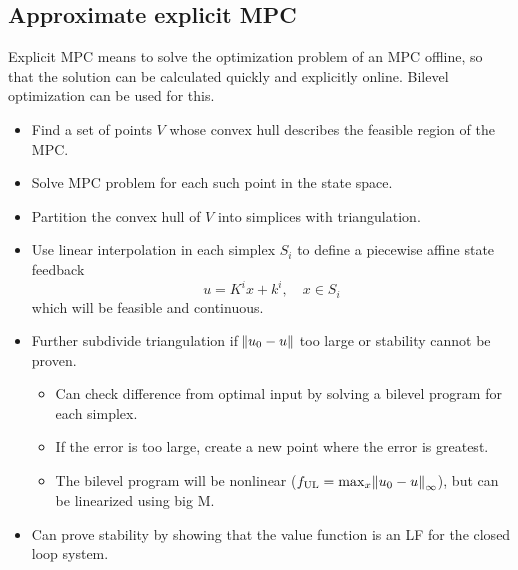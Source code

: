 \subsection{Approximate explicit MPC}
Explicit MPC means to solve the optimization problem of an MPC offline, so that the solution can be calculated quickly and explicitly online. Bilevel optimization can be used for this.
%
\begin{itemize}
  \item Find a set of points $V$ whose convex hull describes the feasible region of the MPC.
  \item Solve MPC problem for each such point in the state space.
  \item Partition the convex hull of $V$ into simplices with triangulation.
  \item Use linear interpolation in each simplex $S_i$ to define a piecewise affine state feedback
  \begin{equation}
    u = K^i x + k^i,\quad x \in S_i
  \end{equation}
  which will be feasible and continuous.
  \item Further subdivide triangulation if $\norm{u_0 - u}$ too large or stability cannot be proven.
  \begin{itemize}
    \item Can check difference from optimal input by solving a bilevel program for each simplex.
    \item If the error is too large, create a new point where the error is greatest.
    \item The bilevel program will be nonlinear ($f_\mathrm{UL} = \max_x \norm{u_0 - u}_\infty$), but can be linearized using big M.
  \end{itemize}
  \item Can prove stability by showing that the value function is an LF for the closed loop system.
\end{itemize}
